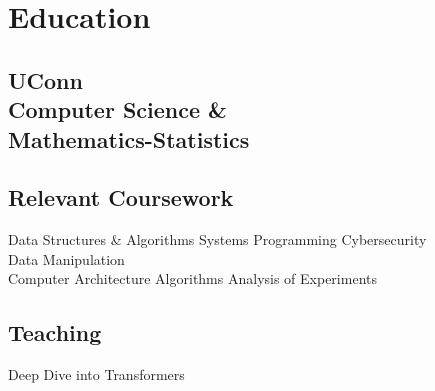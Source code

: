 \documentclass[]{resume-template}
\begin{document}
%
%
\lastupdated{}

%
%

%
%

\begin{minipage}[t]{0.33\textwidth}


    \section{Education}\label{sec:education}

    \subsection{UConn\\ Computer Science \&\\
        Mathematics-Statistics}\label{subsec:uconn}
    \vspace{\topsep}
    \subsection{Relevant Coursework}\label{subsec:coursework}
    Data Structures \& Algorithms \textbullet{} Systems Programming \textbullet{} Cybersecurity \textbullet{}\\ Data Manipulation\\
    Computer Architecture \textbullet{} Algorithms \textbullet{} Analysis of Experiments
    \sectionsep{}
    \subsection{Teaching}\label{subsec:teaching}
    Deep Dive into Transformers




\end{minipage}
\end{document}
